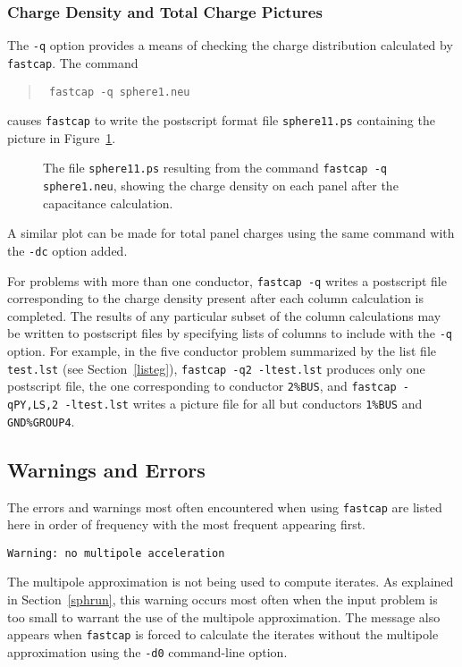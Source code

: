 \subsubsection{Charge Density and Total Charge Pictures}
\label{chgplt}

The {\tt -q} option provides a means of checking the charge distribution
calculated by {\tt fastcap}. The command
\begin{quote}\tt
fastcap -q sphere1.neu
\end{quote}
causes {\tt fastcap} to write the postscript format file {\tt sphere11.ps}
containing the picture in Figure~\ref{sphsha}.
%
%
\begin{figure}
\centerline{
}
\caption{The file {\tt sphere11.ps} resulting from the command {\tt fastcap -q sphere1.neu}, showing the charge density on each panel after the capacitance calculation.}
\label{sphsha}
\end{figure}
A similar plot can be made for total panel charges using the same
command with the {\tt -dc} option added. 

For problems with more than
one conductor, {\tt fastcap -q} writes a postscript file corresponding
to the charge density present after each column calculation is completed.
The results of any particular subset of the column calculations may be
written to postscript files by specifying lists of columns to include
with the {\tt -q} option.  For example, in the five conductor problem
summarized by the list file {\tt test.lst} (see Section~\ref{listeg}),
{\tt fastcap -q2 -ltest.lst} produces only one  postscript file,
the one corresponding to conductor {\tt 2\%BUS}, and 
{\tt fastcap -qPY,LS,2 -ltest.lst}
writes a picture file for all but conductors {\tt 1\%BUS} and 
{\tt GND\%GROUP4}.




\subsection{Warnings and Errors}

The errors and warnings most often encountered when using {\tt fastcap}
are listed here in order of frequency with the most frequent appearing
first.

\begin{verbatim}
Warning: no multipole acceleration
\end{verbatim}\vspace{-\topsep}
The multipole approximation is not being used to compute iterates.
As explained in Section~\ref{sphrun}, this warning occurs most often when the 
input problem is too small to warrant the use of the multipole approximation.
The  message also appears when {\tt fastcap} is forced to calculate
the iterates without the multipole approximation using the {\tt -d0} 
command-line option. 

